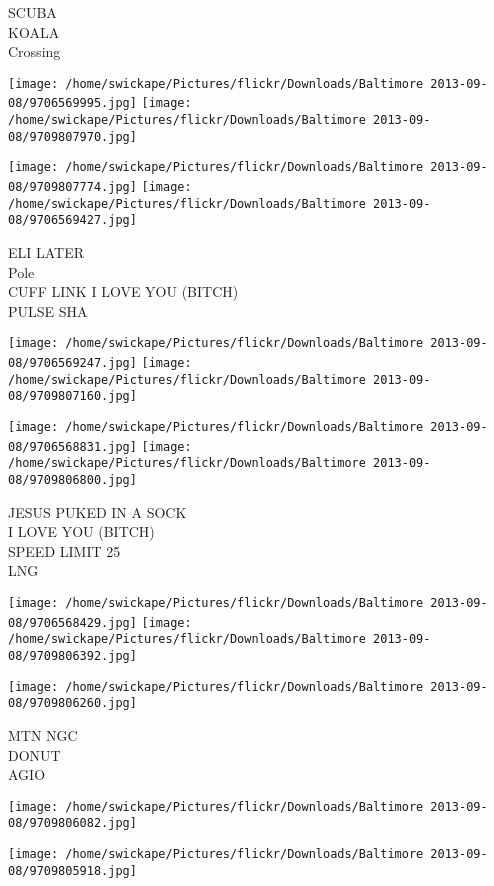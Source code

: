 \documentclass[10pt,letterpaper]{article}
\begin{document}
SCUBA\\
KOALA\\
Crossing
\pagebreak

\texttt{[image: /home/swickape/Pictures/flickr/Downloads/Baltimore 2013-09-08/9706569995.jpg]}
\texttt{[image: /home/swickape/Pictures/flickr/Downloads/Baltimore 2013-09-08/9709807970.jpg]}

\texttt{[image: /home/swickape/Pictures/flickr/Downloads/Baltimore 2013-09-08/9709807774.jpg]}
\texttt{[image: /home/swickape/Pictures/flickr/Downloads/Baltimore 2013-09-08/9706569427.jpg]}

ELI LATER\\
Pole\\
CUFF LINK I LOVE YOU (BITCH)\\
PULSE SHA
\pagebreak

\texttt{[image: /home/swickape/Pictures/flickr/Downloads/Baltimore 2013-09-08/9706569247.jpg]}
\texttt{[image: /home/swickape/Pictures/flickr/Downloads/Baltimore 2013-09-08/9709807160.jpg]}

\texttt{[image: /home/swickape/Pictures/flickr/Downloads/Baltimore 2013-09-08/9706568831.jpg]}
\texttt{[image: /home/swickape/Pictures/flickr/Downloads/Baltimore 2013-09-08/9709806800.jpg]}

JESUS PUKED IN A SOCK\\
I LOVE YOU (BITCH)\\
SPEED LIMIT 25\\
LNG
\pagebreak

\texttt{[image: /home/swickape/Pictures/flickr/Downloads/Baltimore 2013-09-08/9706568429.jpg]}
\texttt{[image: /home/swickape/Pictures/flickr/Downloads/Baltimore 2013-09-08/9709806392.jpg]}

\texttt{[image: /home/swickape/Pictures/flickr/Downloads/Baltimore 2013-09-08/9709806260.jpg]}

MTN NGC\\
DONUT\\
AGIO
\pagebreak

\texttt{[image: /home/swickape/Pictures/flickr/Downloads/Baltimore 2013-09-08/9709806082.jpg]}

\vspace{0.25in}
\texttt{[image: /home/swickape/Pictures/flickr/Downloads/Baltimore 2013-09-08/9709805918.jpg]}
\end{document}

